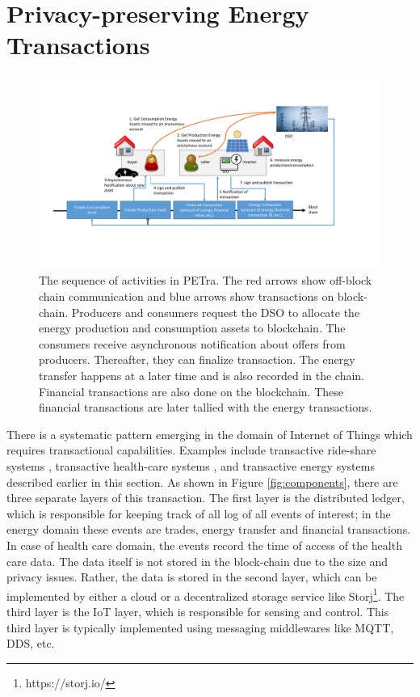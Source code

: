 

\section{Privacy-preserving Energy Transactions}
\label{sec:petra}
\begin{figure}[ht]
\centering
\includegraphics[width=\textwidth]{petra.pdf}
\caption{The sequence of activities in PETra. The red arrows show off-block chain communication and blue arrows show transactions on block-chain. Producers and consumers request the DSO to allocate the energy production and consumption assets to blockchain. The consumers receive asynchronous notification about offers from producers. Thereafter, they can finalize transaction. The energy transfer happens at a later time and is also recorded in the chain. Financial transactions are also done on the blockchain. These financial transactions are later tallied with the energy transactions.}\label{fig:petrasequence}
\end{figure}

There is a systematic pattern emerging in the domain of Internet of Things which requires transactional capabilities. Examples include transactive ride-share systems \cite{yuan2016towards}, transactive health-care systems \cite{azaria2016medrec}, and transactive energy systems described earlier in this section. As shown in Figure \ref{fig:components}, there are three separate layers of this transaction. The first layer is the distributed ledger, which is responsible for keeping track of all log of all events of interest; in the energy domain these events are trades, energy transfer and financial transactions. In case of health care domain, the events record the time of access of the health care data. The data itself is not stored in the block-chain due to the size and privacy issues. Rather, the data is stored in the second layer, which can be implemented by either a cloud or a decentralized storage service like Storj\footnote{https://storj.io/}. The third layer is the IoT layer, which is responsible for sensing and control. This third layer is typically implemented using messaging middlewares like MQTT, DDS, etc. 

